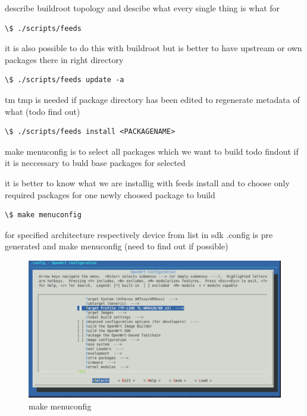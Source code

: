 describe buildroot topology and descibe what every single thing is what for

\begin{lstlisting}[columns=fixed,basicstyle=\ttfamily\footnotesize,tabsize=4,backgroundcolor=\color{yellow!10}]
\$ ./scripts/feeds
\end{lstlisting}

it is also possible to do this with buildroot but is better to have upstream or own packages there in right directory


\begin{lstlisting}[columns=fixed,basicstyle=\ttfamily\footnotesize,tabsize=4,backgroundcolor=\color{yellow!10}]
\$ ./scripts/feeds update -a
\end{lstlisting}

tm tmp is needed if package directory has been edited to regenerate metadata of what (todo find out)


\begin{lstlisting}[columns=fixed,basicstyle=\ttfamily\footnotesize,tabsize=4,backgroundcolor=\color{yellow!10}]
\$ ./scripts/feeds install <PACKAGENAME>
\end{lstlisting}

make menuconfig is to select all packages which we want to build  todo findout if it is neccessary to buld base packages for selected

it is better to know what we are installig with feeds install and to choose only required packages for one newly choosed package to build

\newpage

\begin{lstlisting}[columns=fixed,basicstyle=\ttfamily\footnotesize,tabsize=4,backgroundcolor=\color{yellow!10}]
\$ make menuconfig
\end{lstlisting}
for specified architecture respectively device from list
in sdk .config is pre generated and make menuconfig (need to find out if possible)

\begin{figure}[h]
    \centering
    \includegraphics[scale=0.6]{figures/make_menuconfig.pdf}
    \caption{make menuconfig}
    \label{fig:menuconfig}
\end{figure}

